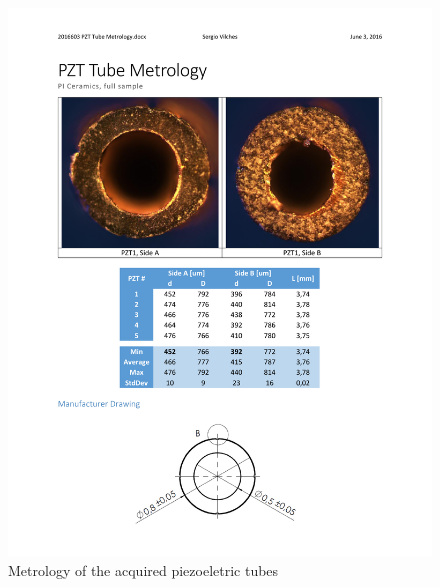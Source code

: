 \begin{figure}[h!]\centering \includegraphics[width=16cm]{appendix/pztPhotos.pdf}
      \caption{Metrology of the acquired piezoeletric tubes}
\end{figure}

